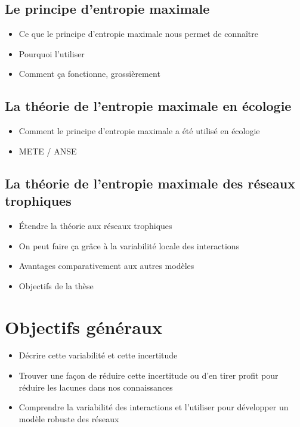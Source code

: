 \subsection{Le principe d'entropie maximale} 

\begin{itemize}
    \item Ce que le principe d'entropie maximale nous permet de connaître
    \item Pourquoi l'utiliser
    \item Comment ça fonctionne, grossièrement
\end{itemize}

\subsection{La théorie de l'entropie maximale en écologie} 

\begin{itemize}
    \item Comment le principe d'entropie maximale a été utilisé en écologie
    \item METE / ANSE
\end{itemize}


\subsection{La théorie de l'entropie maximale des réseaux trophiques} 

\begin{itemize}
    \item Étendre la théorie aux réseaux trophiques
    \item On peut faire ça grâce à la variabilité locale des interactions
    \item Avantages comparativement aux autres modèles
    \item Objectifs de la thèse
\end{itemize}



\section{Objectifs généraux} 

\begin{itemize}
    \item Décrire cette variabilité et cette incertitude
    \item Trouver une façon de réduire cette incertitude ou d'en tirer profit pour réduire les lacunes dans nos connaissances
    \item Comprendre la variabilité des interactions et l'utiliser pour développer un modèle robuste des réseaux
\end{itemize}


